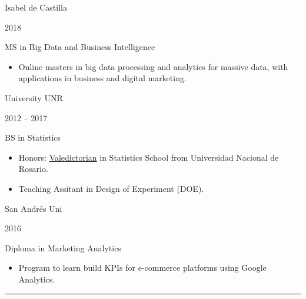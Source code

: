\documentclass[a4paper,10pt]{article}
\newlength{\cvcolumngapwidth}
\newlength{\cvleftcolumnwidth}
\newlength{\cvrightcolumnwidth}
\newcommand{\cvsectionstyle}[1]{{\normalsize\cvsectionfont\textcolor{cvsectioncolor}{#1}}}
\newcommand{\cvtitlestyle}[1]{{\large\cvtitlefont\textcolor{cvtitlecolor}{#1}}}
\newcommand{\cvdurationstyle}[1]{{\small\cvdurationfont\textcolor{cvdurationcolor}{#1}}}
\newcommand{\cvheadingstyle}[1]{{\normalsize\cvheadingfont\textcolor{cvheadingcolor}{#1}}}
\newlength{\cvafteritemskipamount}
\newlength{\cvaftersectionskipamount}
\newlength{\cvaftertitleskipamount}
\newlength{\cvparskip}
\newcommand{\cvsection}[1]{
    \begin{minipage}[t]{\cvleftcolumnwidth}
        \raggedleft\cvsectionstyle{#1}
    \end{minipage}%
    \hspace{\cvcolumngapwidth}%
    \begin{minipage}[t]{\cvrightcolumnwidth}
        \textcolor{cvrulecolor}{\rule{\cvrightcolumnwidth}{0.3mm}}
    \end{minipage}

    \vspace{\cvaftersectionskipamount}
}
\newcommand{\cvitem}[2]{
    \begin{minipage}[t]{\cvleftcolumnwidth}
        \raggedleft #1
    \end{minipage}%
    \hspace{\cvcolumngapwidth}%
    \begin{minipage}[t]{\cvrightcolumnwidth}
        \setlength{\parskip}{\cvparskip} #2
    \end{minipage}

    \vspace{\cvafteritemskipamount}
}
\newcommand{\cvtitle}[1]{
    \cvtitlestyle{#1}

    \vspace{\cvaftertitleskipamount}
    \vspace{-\cvparskip}
}
\begin{document}
\cvitem{
    \cvheadingstyle{Isabel de Castilla}

    \cvdurationstyle{2018}
}{
    \cvtitle{MS in Big Data and Business Intelligence}

    \begin{itemize}[leftmargin=*]
        \item Online masters in big data processing and analytics for massive data, with applications in business and digital marketing.
    \end{itemize}
}

\cvitem{
    \cvheadingstyle{University UNR}

    \cvdurationstyle{2012 -- 2017}
}{
    \cvtitle{BS in Statistics}


    \begin{itemize}[leftmargin=*]
        \item Honors: \href{https://www.fcecon.unr.edu.ar/web-nueva/noticias/abanderados-2016}{Valedictorian} in Statistics School from Universidad Nacional de Rosario.
        \item Teaching Assitant in Design of Experiment (DOE).



    \end{itemize}
}

\cvitem{
    \cvheadingstyle{San Andrés Uni}

    \cvdurationstyle{2016}
}{
    \cvtitle{Diploma in Marketing Analytics}
        \begin{itemize}[leftmargin=*]
        \item Program to learn build KPIs for e-commerce platforms using Google Analytics.

    \end{itemize}



}




\pagebreak{}
\cvsection{VOLUNTEERING}
\end{document}
